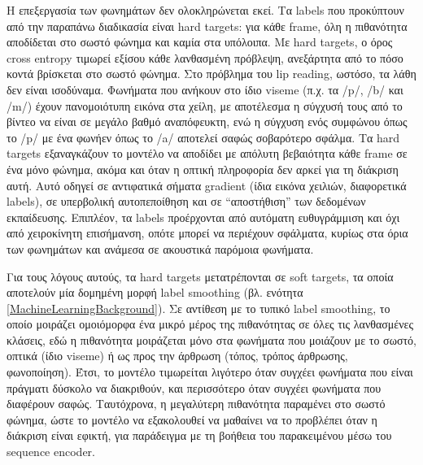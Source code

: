 Η επεξεργασία των φωνημάτων δεν ολοκληρώνεται εκεί. Τα labels που προκύπτουν από την παραπάνω διαδικασία είναι hard targets: για κάθε frame, όλη η πιθανότητα αποδίδεται στο σωστό φώνημα και καμία στα υπόλοιπα. Με hard targets, ο όρος cross entropy τιμωρεί εξίσου κάθε λανθασμένη πρόβλεψη, ανεξάρτητα από το πόσο κοντά βρίσκεται στο σωστό φώνημα. Στο πρόβλημα του lip reading, ωστόσο, τα λάθη δεν είναι ισοδύναμα. Φωνήματα που ανήκουν στο ίδιο viseme (π.χ. τα /p/, /b/ και /m/) έχουν πανομοιότυπη εικόνα στα χείλη, με αποτέλεσμα η σύγχυσή τους από το βίντεο να είναι σε μεγάλο βαθμό αναπόφευκτη, ενώ η σύγχυση ενός συμφώνου όπως το /p/ με ένα φωνήεν όπως το /a/ αποτελεί σαφώς σοβαρότερο σφάλμα. Τα hard targets εξαναγκάζουν το μοντέλο να αποδίδει με απόλυτη βεβαιότητα κάθε frame σε ένα μόνο φώνημα, ακόμα και όταν η οπτική πληροφορία δεν αρκεί για τη διάκριση αυτή. Αυτό οδηγεί σε αντιφατικά σήματα gradient (ίδια εικόνα χειλιών, διαφορετικά labels), σε υπερβολική αυτοπεποίθηση και σε ``αποστήθιση'' των δεδομένων εκπαίδευσης. Επιπλέον, τα labels προέρχονται από αυτόματη ευθυγράμμιση και όχι από χειροκίνητη επισήμανση, οπότε μπορεί να περιέχουν σφάλματα, κυρίως στα όρια των φωνημάτων και ανάμεσα σε ακουστικά παρόμοια φωνήματα.

Για τους λόγους αυτούς, τα hard targets μετατρέπονται σε soft targets, τα οποία αποτελούν μία δομημένη μορφή label smoothing (βλ. ενότητα \ref{MachineLearningBackground}). Σε αντίθεση με το τυπικό label smoothing, το οποίο μοιράζει ομοιόμορφα ένα μικρό μέρος της πιθανότητας σε όλες τις λανθασμένες κλάσεις, εδώ η πιθανότητα μοιράζεται μόνο στα φωνήματα που μοιάζουν με το σωστό, οπτικά (ίδιο viseme) ή ως προς την άρθρωση (τόπος, τρόπος άρθρωσης, φωνοποίηση). Έτσι, το μοντέλο τιμωρείται λιγότερο όταν συγχέει φωνήματα που είναι πράγματι δύσκολο να διακριθούν, και περισσότερο όταν συγχέει φωνήματα που διαφέρουν σαφώς. Ταυτόχρονα, η μεγαλύτερη πιθανότητα παραμένει στο σωστό φώνημα, ώστε το μοντέλο να εξακολουθεί να μαθαίνει να το προβλέπει όταν η διάκριση είναι εφικτή, για παράδειγμα με τη βοήθεια του παρακειμένου μέσω του sequence encoder.

